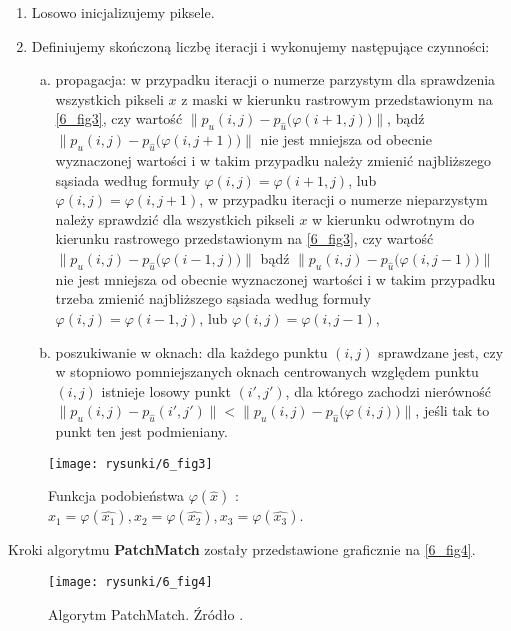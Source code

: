 \documentclass[a4paper,12pt,twoside,openany]{report}
\begin{document}
\begin{enumerate}
\item
Losowo inicjalizujemy piksele.
\item
Definiujemy skończoną liczbę iteracji i wykonujemy następujące czynności:
\begin{enumerate}[a)]
\item
propagacja: w przypadku iteracji o numerze parzystym dla sprawdzenia wszystkich pikseli $x$ z maski w kierunku rastrowym przedstawionym na \autoref{6_fig3}, czy 
wartość $\big\| p_u(i,j) - p_{\hat{u}}\big(\varphi(i+1,j)\big) \big\|$, bądź $\big\| p_{u}(i,j) - p_{\hat{u}}\big(\varphi(i,j+1)\big) \big\|$ nie jest mniejsza od obecnie wyznaczonej wartości i w takim przypadku należy zmienić najbliższego sąsiada według formuły $\varphi(i,j) = \varphi(i+1,j)$, lub $\varphi(i,j) = \varphi(i,j+1)$, 
w przypadku iteracji o numerze nieparzystym należy sprawdzić dla wszystkich pikseli $x$ w kierunku odwrotnym do kierunku rastrowego przedstawionym na \autoref{6_fig3}, czy 
wartość $\big\| p_{u}(i,j) - p_{\hat{u}}\big(\varphi(i-1,j)\big) \big\|$ bądź $\big\| p_{u}(i,j) - p_{\hat{u}}\big(\varphi(i,j-1)\big) \big\|$ nie jest mniejsza od obecnie wyznaczonej wartości i w takim przypadku trzeba zmienić najbliższego sąsiada według formuły $\varphi(i,j) = \varphi(i-1,j)$, lub $\varphi(i,j) = \varphi(i,j-1)$,
\item
poszukiwanie w oknach: dla każdego punktu $(i,j)$ sprawdzane jest, czy w stopniowo pomniejszanych oknach centrowanych względem punktu $(i,j)$ istnieje losowy punkt $(i', j')$, dla którego zachodzi nierówność $\big\| p_{u}(i,j) - p_{\hat{u}}(i',j') \big\| < \big\| p_{u}(i,j) - p_{\hat{u}}\big(\varphi(i,j) \big)\big\|$, jeśli tak to punkt ten jest podmieniany.
\end{enumerate}
\end{enumerate}
\begin{figure}[!h]
	\centering
	\texttt{[image: rysunki/6\_fig3]}
	\caption{Funkcja podobieństwa $\varphi(\hat{x})$ : $x_1 = \varphi(\hat{x_1}), x_2 = \varphi(\hat{x_2}), x_3 = \varphi(\hat{x_3})$.}
	\label{6_fig3}
\end{figure}
Kroki algorytmu \textbf{PatchMatch} zostały przedstawione graficznie na \autoref{6_fig4}.
\begin{figure}[!h]
	\centering
	\texttt{[image: rysunki/6\_fig4]}
	\caption{Algorytm PatchMatch. Źródło \cite{arias2011variational}.}
	\label{6_fig4}
\end{figure}
\end{document}
